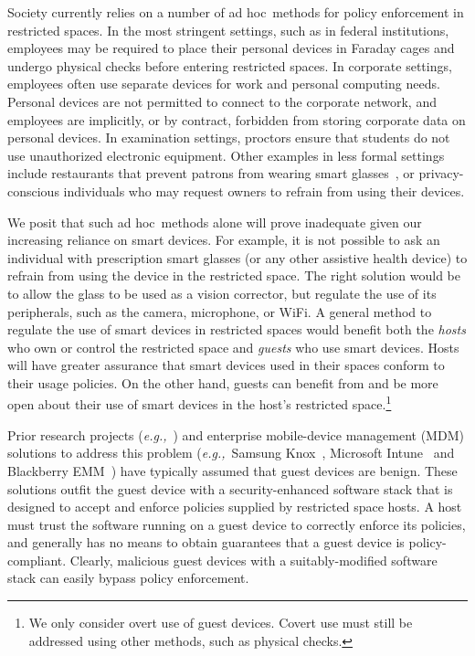 \documentclass[pageno]{sig-alternate-05-2015}
\newcommand{\eg}{\textit{e.g.,}}
\newcommand{\adhoc}{ad hoc}
\begin{document}
Society currently relies on a number of \adhoc\ methods for policy enforcement
in restricted spaces. In the most stringent settings, such as in federal
institutions, employees may be required to place their personal devices in
Faraday cages and undergo physical checks before entering restricted spaces.
In corporate settings, employees often use separate devices for work and
personal computing needs. Personal devices are not permitted to connect to the
corporate network, and employees are implicitly, or by contract, forbidden from
storing corporate data on personal devices. In examination settings, proctors
ensure that students do not use unauthorized electronic equipment.  Other
examples in less formal settings include restaurants that prevent patrons from
wearing smart glasses~\cite{url:glassban}, or privacy-conscious individuals who
may request owners to refrain from using their devices.

We posit that such \adhoc\ methods alone will prove inadequate given our
increasing reliance on smart devices. For example, it is not possible to ask an
individual with prescription smart glasses (or any other assistive health
device) to refrain from using the device in the restricted space. The right
solution would be to allow the glass to be used as a vision corrector, but
regulate the use of its peripherals, such as the camera, microphone, or WiFi.
A general method to regulate the use of smart devices in restricted spaces
would benefit both the \textit{hosts} who own or control the restricted space
and \textit{guests} who use smart devices.  Hosts will have greater assurance
that smart devices used in their spaces conform to their usage policies. On the
other hand, guests can benefit from and be more open about their use of smart
devices in the host's restricted space.\footnote{We only consider overt use of
guest devices.  Covert use must still be addressed using other methods, such as
physical checks.}

Prior research projects
(\eg~\cite{asm:sec14,flaskdroid:sec13,conxsense:asiaccs14,worlddriven:ccs14,blindspot:2009,markit:upside14})
and enterprise mobile-device management (MDM) solutions to address this problem
(\eg\ Samsung Knox~\cite{knox:mdm}, Microsoft Intune~\cite{ms:intune} and
Blackberry EMM~\cite{blackberry:emm}) have typically assumed that guest devices
are benign. These solutions outfit the guest device with a security-enhanced
software stack that is designed to accept and enforce policies supplied by
restricted space hosts. A host must trust the software running on a guest
device to correctly enforce its policies, and generally has no means to obtain
guarantees that a guest device is policy-compliant.  Clearly, malicious guest
devices with a suitably-modified software stack can easily bypass policy
enforcement.
\end{document}
